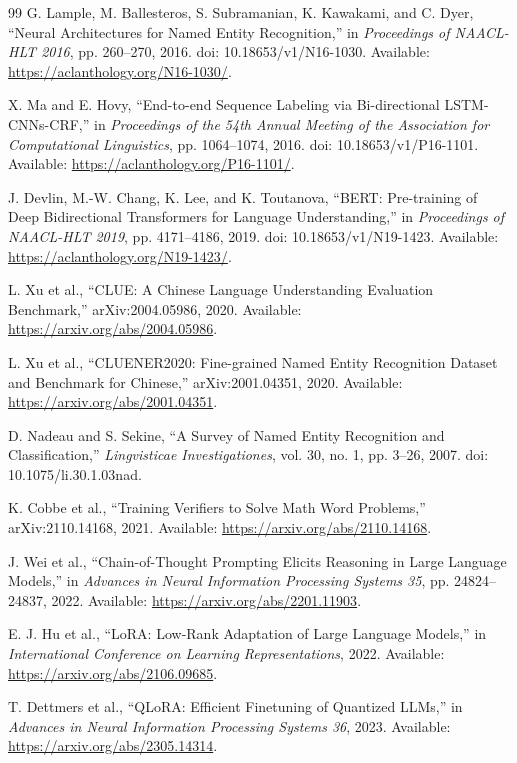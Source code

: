 \documentclass[UTF8,a4paper,12pt,fontset=none]{ctexart}
\begin{document}
\begin{thebibliography}{99}
 G. Lample, M. Ballesteros, S. Subramanian, K. Kawakami, and C. Dyer, ``Neural Architectures for Named Entity Recognition,'' in \textit{Proceedings of NAACL-HLT 2016}, pp. 260--270, 2016. doi: 10.18653/v1/N16-1030. Available: \url{https://aclanthology.org/N16-1030/}.

 X. Ma and E. Hovy, ``End-to-end Sequence Labeling via Bi-directional LSTM-CNNs-CRF,'' in \textit{Proceedings of the 54th Annual Meeting of the Association for Computational Linguistics}, pp. 1064--1074, 2016. doi: 10.18653/v1/P16-1101. Available: \url{https://aclanthology.org/P16-1101/}.

 J. Devlin, M.-W. Chang, K. Lee, and K. Toutanova, ``BERT: Pre-training of Deep Bidirectional Transformers for Language Understanding,'' in \textit{Proceedings of NAACL-HLT 2019}, pp. 4171--4186, 2019. doi: 10.18653/v1/N19-1423. Available: \url{https://aclanthology.org/N19-1423/}.

 L. Xu et al., ``CLUE: A Chinese Language Understanding Evaluation Benchmark,'' arXiv:2004.05986, 2020. Available: \url{https://arxiv.org/abs/2004.05986}.

 L. Xu et al., ``CLUENER2020: Fine-grained Named Entity Recognition Dataset and Benchmark for Chinese,'' arXiv:2001.04351, 2020. Available: \url{https://arxiv.org/abs/2001.04351}.

 D. Nadeau and S. Sekine, ``A Survey of Named Entity Recognition and Classification,'' \textit{Lingvisticae Investigationes}, vol. 30, no. 1, pp. 3--26, 2007. doi: 10.1075/li.30.1.03nad.

 K. Cobbe et al., ``Training Verifiers to Solve Math Word Problems,'' arXiv:2110.14168, 2021. Available: \url{https://arxiv.org/abs/2110.14168}.

 J. Wei et al., ``Chain-of-Thought Prompting Elicits Reasoning in Large Language Models,'' in \textit{Advances in Neural Information Processing Systems 35}, pp. 24824--24837, 2022. Available: \url{https://arxiv.org/abs/2201.11903}.

 E. J. Hu et al., ``LoRA: Low-Rank Adaptation of Large Language Models,'' in \textit{International Conference on Learning Representations}, 2022. Available: \url{https://arxiv.org/abs/2106.09685}.

 T. Dettmers et al., ``QLoRA: Efficient Finetuning of Quantized LLMs,'' in \textit{Advances in Neural Information Processing Systems 36}, 2023. Available: \url{https://arxiv.org/abs/2305.14314}.


\end{thebibliography}
\end{document}
